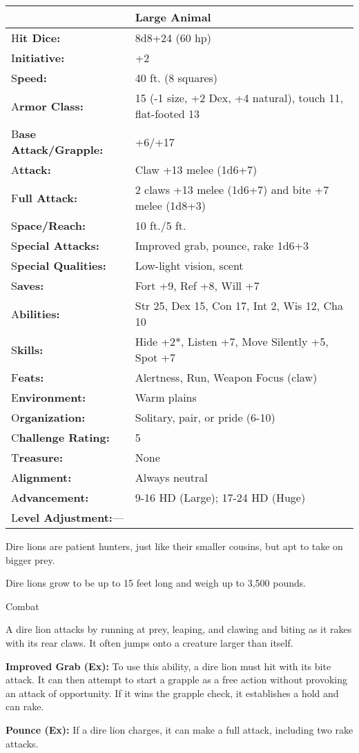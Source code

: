 \documentclass{article}
\begin{document}
\begin{tabular}{|>{\raggedright}p{91pt}|>{\raggedright}p{226pt}|}
\hline
  & Large Animal\tabularnewline
\hline
H\textbf{it Dice:} & 8d8+24 (60 hp)\tabularnewline
\hline
I\textbf{nitiative:} & +2\tabularnewline
\hline
S\textbf{peed:} & 40 ft. (8 squares)\tabularnewline
\hline
A\textbf{rmor Class:} & 15 (-1 size, +2 Dex, +4 natural), touch 11, flat-footed 
13\tabularnewline
\hline
B\textbf{ase Attack/Grapple:} & +6/+17\tabularnewline
\hline
A\textbf{ttack:} & Claw +13 melee (1d6+7)\tabularnewline
\hline
F\textbf{ull Attack:} & 2 claws +13 melee (1d6+7) and bite +7 melee (1d8+3)\tabularnewline
\hline
S\textbf{pace/Reach:} & 10 ft./5 ft.\tabularnewline
\hline
S\textbf{pecial Attacks:} & Improved grab, pounce, rake 1d6+3\tabularnewline
\hline
S\textbf{pecial Qualities:} & Low-light vision, scent\tabularnewline
\hline
S\textbf{aves:} & Fort +9, Ref +8, Will +7\tabularnewline
\hline
A\textbf{bilities:} & Str 25, Dex 15, Con 17, Int 2, Wis 12, Cha 10\tabularnewline
\hline
S\textbf{kills:} & Hide +2*, Listen +7, Move Silently +5, Spot +7\tabularnewline
\hline
F\textbf{eats:} & Alertness, Run, Weapon Focus (claw)\tabularnewline
\hline
E\textbf{nvironment:} & Warm plains\tabularnewline
\hline
O\textbf{rganization:} & Solitary, pair, or pride (6-10)\tabularnewline
\hline
C\textbf{hallenge Rating:} & 5\tabularnewline
\hline
T\textbf{reasure:} & None\tabularnewline
\hline
A\textbf{lignment:} & Always neutral\tabularnewline
\hline
A\textbf{dvancement:} & 9-16 HD (Large); 17-24 HD (Huge)\tabularnewline
\hline
L\textbf{evel Adjustment:}--- & \tabularnewline
\hline
\end{tabular}

Dire lions are patient hunters, just like their smaller cousins, but apt to take 
on bigger prey.

Dire lions grow to be up to 15 feet long and weigh up to 3,500 pounds.

Combat

A dire lion attacks by running at prey, leaping, and clawing and biting as it rakes 
with its rear claws. It often jumps onto a creature larger than itself.

\textbf{Improved Grab (Ex):} To use this ability, a dire lion must hit with its 
bite attack. It can then attempt to start a grapple as a free action without provoking 
an attack of opportunity. If it wins the grapple check, it establishes a hold and 
can rake.

\textbf{Pounce (Ex):} If a dire lion charges, it can make a full attack, including 
two rake attacks.
\end{document}
